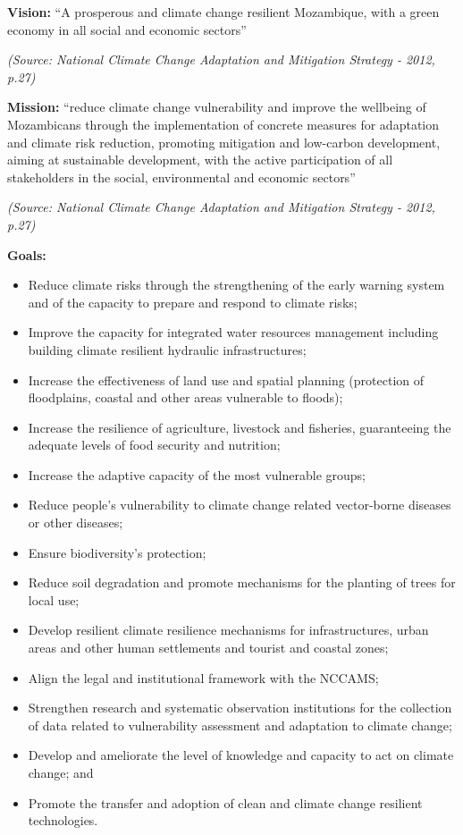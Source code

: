 \documentclass[
]{book}
\providecommand{\tightlist}{%
  \setlength{\itemsep}{0pt}\setlength{\parskip}{0pt}}
\begin{document}
\textbf{Vision:} ``A prosperous and climate change resilient Mozambique, with a green economy in all social and economic sectors''

\emph{(Source: National Climate Change Adaptation and Mitigation Strategy - 2012, p.27)}

\textbf{Mission:} ``reduce climate change vulnerability and improve the wellbeing of Mozambicans through the implementation of concrete measures for adaptation and climate risk reduction, promoting mitigation and low-carbon development, aiming at sustainable development, with the active participation of all stakeholders in the social, environmental and economic sectors''

\emph{(Source: National Climate Change Adaptation and Mitigation Strategy - 2012, p.27)}

\textbf{Goals:}

\begin{itemize}
\tightlist
\item
  Reduce climate risks through the strengthening of the early warning system and of the capacity to prepare and respond to climate risks;
\item
  Improve the capacity for integrated water resources management including building climate resilient hydraulic infrastructures;
\item
  Increase the effectiveness of land use and spatial planning (protection of floodplains, coastal and other areas vulnerable to floods);
\item
  Increase the resilience of agriculture, livestock and fisheries, guaranteeing the adequate levels of food security and nutrition;
\item
  Increase the adaptive capacity of the most vulnerable groups;
\item
  Reduce people's vulnerability to climate change related vector-borne diseases or other diseases;
\item
  Ensure biodiversity's protection;
\item
  Reduce soil degradation and promote mechanisms for the planting of trees for local use;
\item
  Develop resilient climate resilience mechanisms for infrastructures, urban areas and other human settlements and tourist and coastal zones;
\item
  Align the legal and institutional framework with the NCCAMS;
\item
  Strengthen research and systematic observation institutions for the collection of data related to vulnerability assessment and adaptation to climate change;
\item
  Develop and ameliorate the level of knowledge and capacity to act on climate change; and
\item
  Promote the transfer and adoption of clean and climate change resilient technologies.
\end{itemize}
\end{document}
